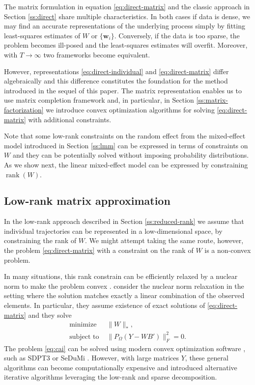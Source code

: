 \documentclass[preprint]{imsart}
\numberwithin{equation}{section}
\theoremstyle{plain}
\newcommand{\N}{\mathbb{N}}
\newcommand{\bw}{\mathbf{w}}
\DeclareMathOperator*{\rank}{rank}
\begin{document}
The matrix formulation in equation \eqref{eq:direct-matrix} and the classic approach in Section \ref{ss:direct} share multiple characteristics. In both cases if data is dense, we may find an accurate representations of the underlying process simply by fitting least-squares estimates of $W$ or $\{\bw_i\}$. Conversely, if the data is too sparse, the problem becomes ill-posed and the least-squares estimates will overfit. Moreover, with $T \rightarrow \infty$ two frameworks become equivalent.

However, representations \eqref{eq:direct-individual} and \eqref{eq:direct-matrix} differ algebraically and this difference constitutes the foundation for the method introduced in the sequel of this paper. The matrix representation enables us to use matrix completion framework and, in particular, in Section \ref{ss:matrix-factorization} we introduce convex optimization algorithms for solving \eqref{eq:direct-matrix} with additional constraints.

Note that some low-rank constraints on the random effect from the mixed-effect model introduced in Section \ref{ss:lmm} can be expressed in terms of constraints on $W$ and they can be potentially solved without imposing probability distributions. As we show next, the linear mixed-effect model can be expressed by constraining $\rank(W)$. %

\subsection{Low-rank matrix approximation}\label{ss:low-rank-matrix}
In the low-rank approach described in Section \ref{ss:reduced-rank} we assume that individual trajectories can be represented in a low-dimensional space, by constraining the rank of $W$. We might attempt taking the same route, however, the problem \eqref{eq:direct-matrix} with a constraint on the rank of $W$ is a non-convex problem.

In many situations, this rank constrain can be efficiently relaxed by a nuclear norm to make the problem convex \citep{candes2009exact, fazel2002matrix}. \citet{candes2009near} consider the nuclear norm relaxation in the setting where the solution matches exactly a linear combination of the observed elements. In particular, they assume existence of exact solutions of \eqref{eq:direct-matrix} and they solve
\begin{align} 
\text{minimize\ \ } & \|W\|_*,  \nonumber\\
\text{subject to\ \ } & \| P_\Omega(Y - WB') \|_F^2 = 0.
\label{eq:cai}
\end{align}
The problem \eqref{eq:cai} can be solved using modern convex optimization software \citep{grant2008graph,boyd2004convex}, such as SDPT3 \citep{toh1999sdpt3} or SeDuMi \citep{sturm1999using}. However, with large matrices $Y$, these general algorithms can become computationally expensive and \citet{cai2010singular,mazumder2010spectral} introduced alternative iterative algorithms leveraging the low-rank and sparse decomposition.
\end{document}
